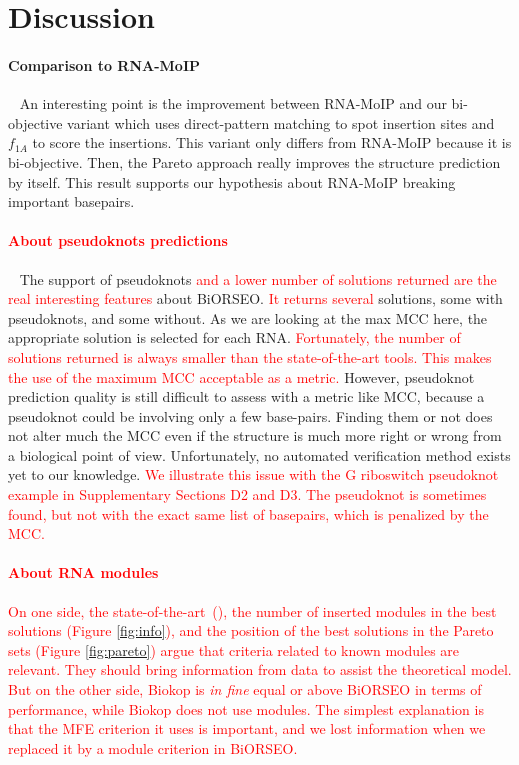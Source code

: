 \documentclass{bioinfo}
\begin{document}
\section{Discussion}
\paragraph{Comparison to RNA-MoIP} ~  An interesting point is the improvement between RNA-MoIP and our bi-objective variant which uses direct-pattern matching to spot insertion sites and $f_{1A}$ to score the insertions. This variant only differs from RNA-MoIP because it is bi-objective.  
Then, the Pareto approach really improves the structure prediction by itself. This result supports our hypothesis about RNA-MoIP breaking important basepairs.

\paragraph{\textcolor{red}{About pseudoknots predictions}} ~ 
The support of pseudoknots \textcolor{red}{and a lower number of solutions returned are the real interesting features} about BiORSEO. \textcolor{red}{It returns several} solutions, some with pseudoknots, and some without. As we are looking at the max MCC here, the appropriate solution is selected for each RNA. \textcolor{red}{Fortunately, the number of solutions returned is always smaller than the state-of-the-art tools. This makes the use of the maximum MCC acceptable as a metric.}
However, pseudoknot prediction quality is still difficult to assess with a metric like MCC, because a pseudoknot could be involving only a few base-pairs. Finding them or not does not alter much the MCC even if the structure is much more right or wrong from a biological point of view. Unfortunately, no automated verification method exists yet to our knowledge. \textcolor{red}{We illustrate this issue with the G riboswitch pseudoknot example in Supplementary Sections D2 and D3. The pseudoknot is sometimes found, but not with the exact same list of basepairs, which is penalized by the MCC.} 
\paragraph{\textcolor{red}{About RNA modules}}
\textcolor{red}{
On one side, the state-of-the-art~(\citealp{reinharz_towards_2012, theis2015rna}), the number of inserted modules in the best solutions (Figure \ref{fig:info}), and the position of the best solutions in the Pareto sets (Figure \ref{fig:pareto}) argue that criteria related to known modules are relevant. They should bring information from data to assist the theoretical model. But on the other side, Biokop is  \textit{in fine} equal or above BiORSEO in terms of performance, while Biokop does not use modules. The simplest explanation is that the MFE criterion it uses is important, and we lost information when we replaced it by a module criterion in BiORSEO.
}
\end{document}
